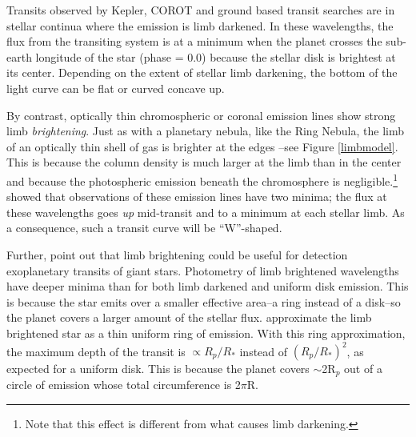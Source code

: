 \documentclass[twocolumn]{emulateapj}
\begin{document}
Transits observed by Kepler, COROT and ground based transit searches are in stellar continua where the emission is limb darkened. In these wavelengths, the flux from the transiting system is at a minimum when the planet crosses the sub-earth longitude of the star (phase = 0.0) because the stellar disk is brightest at its center. Depending on the extent of stellar limb darkening, the bottom of the light curve can be flat or curved concave up.

%

By contrast, optically thin
chromospheric or coronal emission lines show strong limb {\it brightening}. Just as with a planetary
nebula, like the Ring Nebula, the limb of an optically thin shell of
gas is brighter at the edges --see Figure \ref{limbmodel}. This is because the column density is much larger at the limb than in the center and because the photospheric emission beneath the chromosphere is negligible.\footnote{Note
that this effect is different from what causes limb darkening.} \citet{assef} showed that observations of these emission lines have two minima; the flux at these wavelengths goes
{\it up} mid-transit and to a minimum at each stellar limb. As a
consequence, such a transit curve will be ``W''-shaped.

Further, \citet{assef} point out that limb brightening could be
useful for detection exoplanetary transits of giant stars. Photometry of limb brightened wavelengths have
deeper minima than for both limb darkened and uniform disk
emission. This is because the star emits over a smaller effective area--a ring instead of a disk--so the planet covers a larger amount of the
stellar flux. \citet{assef} approximate the limb brightened
star as a thin uniform ring of emission. With this ring approximation, the maximum depth
of the transit is  $\propto R_p/R_*$ instead of $(R_p/R_*)^2$,
as expected for a uniform disk. This is because the planet covers $\sim$2R$_p$ out of a circle of emission whose total circumference is 2$\pi$R. 
\end{document}
